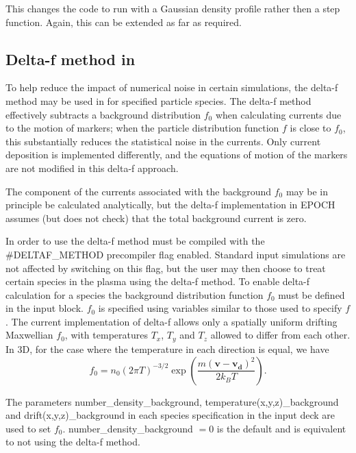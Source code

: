 This changes the code to run with a Gaussian density profile rather then a step
function. Again, this can be extended as far as required.
%

\subsection{\texorpdfstring
  {Delta-f method in {\EPOCH}}
  {Delta-f method in {EPOCH}}}
\label{sec:deltaf}

To help reduce the impact of numerical noise in certain simulations, the
delta-f method may be used in {\EPOCH} for specified particle species. The
delta-f method effectively subtracts a background distribution $f_0$ when
calculating currents due to the motion of markers; when the particle
distribution function $f$ is close to $f_0$, this substantially reduces the
statistical noise in the currents. Only current deposition is implemented
differently, and the equations of motion of the markers are not modified in
this delta-f approach.

The component of the currents associated with the background $f_0$ may be in
principle be calculated analytically, but the delta-f implementation in EPOCH
assumes (but does not check) that the total background current is zero.

In order to use the delta-f method {\EPOCH} must be compiled with the
\#DELTAF\_METHOD precompiler flag enabled. Standard {\EPOCH} input simulations
are not affected by switching on this flag, but the user may then choose to
treat certain species in the plasma using the delta-f method. To enable
delta-f calculation for a species the background distribution function $f_0$
must be defined in the input block. $f_0$ is specified using variables similar
to those used to specify $f$.  The current implementation of delta-f allows
only a spatially uniform drifting Maxwellian $f_0$, with temperatures $T_x$,
$T_y$ and $T_z$ allowed to differ from each other. In 3D, for the case where
the temperature in each direction is equal, we have
\begin{equation*}
  f_0 = n_0 (2 \pi T)^{-3/2}
    \exp\left( \frac{m (\mathbf{v} - \mathbf{v_d})^2}{2 k_B T} \right).
\end{equation*}

The parameters number\_density\_background, temperature(x,y,z)\_background and
drift(x,y,z)\_background in each species specification in the input deck are
used to set $f_0$.
number\_density\_background $=0$ is the default and is equivalent to not using
the delta-f method.


